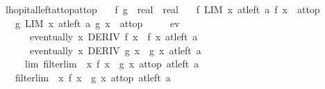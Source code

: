 \begin{isabellebody}
\isanewline
{}\isamarkupfalse%
\ lhopital{\isacharunderscore}{\kern0pt}left{\isacharunderscore}{\kern0pt}at{\isacharunderscore}{\kern0pt}top{\isacharunderscore}{\kern0pt}at{\isacharunderscore}{\kern0pt}top{\isacharcolon}{\kern0pt}\isanewline
\ \ \ f\ g\ {\isacharcolon}{\kern0pt}{\isacharcolon}{\kern0pt}\ {\isachardoublequoteopen}real\ {\isasymRightarrow}\ real{\isachardoublequoteclose}\isanewline
\ \ \ f{\isacharunderscore}{\kern0pt}{}{\isacharcolon}{\kern0pt}\ {\isachardoublequoteopen}LIM\ x\ at{\isacharunderscore}{\kern0pt}left\ a{\isachardot}{\kern0pt}\ f\ x\ {\isacharcolon}{\kern0pt}{\isachargreater}{\kern0pt}\ at{\isacharunderscore}{\kern0pt}top{\isachardoublequoteclose}\isanewline
\ \ \ g{\isacharunderscore}{\kern0pt}{}{\isacharcolon}{\kern0pt}\ {\isachardoublequoteopen}LIM\ x\ at{\isacharunderscore}{\kern0pt}left\ a{\isachardot}{\kern0pt}\ g\ x\ {\isacharcolon}{\kern0pt}{\isachargreater}{\kern0pt}\ at{\isacharunderscore}{\kern0pt}top{\isachardoublequoteclose}\isanewline
\ \ \ \ \ ev{\isacharcolon}{\kern0pt}\isanewline
\ \ \ \ \ \ {\isachardoublequoteopen}eventually\ {\isacharparenleft}{\kern0pt}{\isasymlambda}x{\isachardot}{\kern0pt}\ DERIV\ f\ x\ {\isacharcolon}{\kern0pt}{\isachargreater}{\kern0pt}\ f{\isacharprime}{\kern0pt}\ x{\isacharparenright}{\kern0pt}\ {\isacharparenleft}{\kern0pt}at{\isacharunderscore}{\kern0pt}left\ a{\isacharparenright}{\kern0pt}{\isachardoublequoteclose}\isanewline
\ \ \ \ \ \ {\isachardoublequoteopen}eventually\ {\isacharparenleft}{\kern0pt}{\isasymlambda}x{\isachardot}{\kern0pt}\ DERIV\ g\ x\ {\isacharcolon}{\kern0pt}{\isachargreater}{\kern0pt}\ g{\isacharprime}{\kern0pt}\ x{\isacharparenright}{\kern0pt}\ {\isacharparenleft}{\kern0pt}at{\isacharunderscore}{\kern0pt}left\ a{\isacharparenright}{\kern0pt}{\isachardoublequoteclose}\isanewline
\ \ \ \ \ lim{\isacharcolon}{\kern0pt}\ {\isachardoublequoteopen}filterlim\ {\isacharparenleft}{\kern0pt}{\isasymlambda}\ x{\isachardot}{\kern0pt}\ {\isacharparenleft}{\kern0pt}f{\isacharprime}{\kern0pt}\ x\ {\isacharslash}{\kern0pt}\ g{\isacharprime}{\kern0pt}\ x{\isacharparenright}{\kern0pt}{\isacharparenright}{\kern0pt}\ at{\isacharunderscore}{\kern0pt}top\ {\isacharparenleft}{\kern0pt}at{\isacharunderscore}{\kern0pt}left\ a{\isacharparenright}{\kern0pt}{\isachardoublequoteclose}\isanewline
\ \ \ {\isachardoublequoteopen}filterlim\ {\isacharparenleft}{\kern0pt}{\isasymlambda}\ x{\isachardot}{\kern0pt}\ f\ x\ {\isacharslash}{\kern0pt}\ g\ x{\isacharparenright}{\kern0pt}\ at{\isacharunderscore}{\kern0pt}top\ {\isacharparenleft}{\kern0pt}at{\isacharunderscore}{\kern0pt}left\ a{\isacharparenright}{\kern0pt}{\isachardoublequoteclose}\isanewline

\end{isabellebody}
